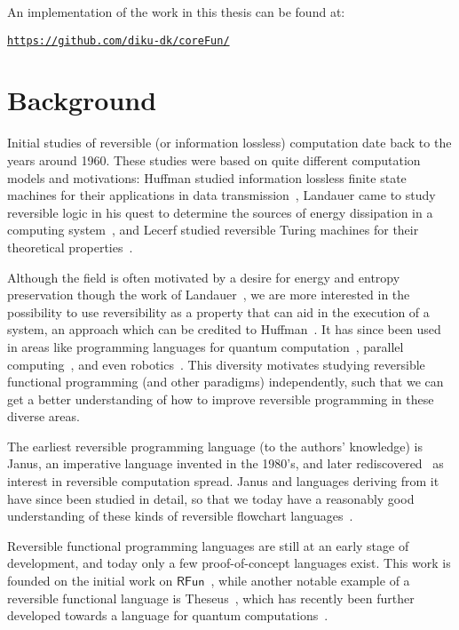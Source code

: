 \documentclass[a4paper,10p,openright]{memoir}
\def\rfun{\ensuremath{\mathsf{RFun}}\xspace}
\begin{document}
An implementation of the work in this thesis can be found at:

\begin{center}
  \texttt{\url{https://github.com/diku-dk/coreFun/}}
\end{center}

\section{Background}

Initial studies of reversible (or information lossless) computation date back
to the years around 1960. These studies were based on quite different
computation models and motivations: Huffman studied information lossless finite
state machines for their applications in data transmission~\cite{Huffman:1959},
Landauer came to study reversible logic in his quest to determine the sources
of energy dissipation in a computing system~\cite{Landauer:1961}, and Lecerf
studied reversible Turing machines for their theoretical
properties~\cite{Lecerf:1963}.

Although the field is often motivated by a desire for energy and entropy
preservation though the work of Landauer~\cite{Landauer:1961}, we are more
interested in the possibility to use reversibility as a property that can aid
in the execution of a system, an approach which can be credited to
Huffman~\cite{Huffman:1959}. It has since been used in areas like programming
languages for quantum computation~\cite{GreenEtAl:2013:Quip}, parallel
computing~\cite{SchordanEtal:2015:RC}, and even
robotics~\cite{SchultzLEA:2015}. This diversity motivates studying reversible
functional programming (and other paradigms) independently, such that we can
get a better understanding of how to improve reversible programming in these
diverse areas.

The earliest reversible programming language (to the authors' knowledge) is
Janus, an imperative language invented in the 1980's, and later
rediscovered~\cite{LutzDerby:1986,YokoyamaGlueck:2007:Janus} as interest in
reversible computation spread. Janus and languages deriving from it have
since been studied in detail, so that we today have a reasonably good
understanding of these kinds of reversible flowchart
languages~\cite{YokoyamaEtAl:2015,GlueckKaarsgaard:2018}.

Reversible functional programming languages are still at an early stage of
development, and today only a few proof-of-concept languages exist. This work
is founded on the initial work on
\rfun~\cite{YokoyamaAxelsenGlueck:2012:LNCS,ThomsenAxelsen:2016:IFL}, while
another notable example of a reversible functional language is
Theseus~\cite{JamesSabry:2014:RC}, which has recently been further developed
towards a language for quantum computations~\cite{SabryEtal:2018}.
\end{document}
